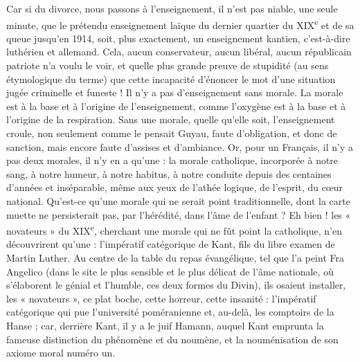 \documentclass[french,twoside]{book} %
\begin{document}
Car si du divorce, nous passons à l’enseignement, il n’est pas niable, une seule minute, que le prétendu enseignement laïque du dernier quartier du XIX\textsuperscript{e} et de sa queue jusqu’en 1914, soit, plus exactement, un enseignement kantien, c’est-à-dire luthérien et allemand. Cela, aucun conservateur, aucun libéral, aucun républicain patriote n’a voulu le voir, et quelle plus grande preuve de stupidité (au sens étymologique du terme) que cette incapacité d’énoncer le mot d’une situation jugée criminelle et funeste ! Il n’y a pas d’enseignement sans morale. La morale est à la base et à l’origine de l’enseignement, comme l’oxygène est à la base et à l’origine de la respiration. Sans une morale, quelle qu’elle soit, l’enseignement croule, non seulement comme le pensait Guyau, faute d’obligation, et donc de sanction, mais encore faute d’assises et d’ambiance. Or, pour un Français, il n’y a pas deux morales, il n’y en a qu’une : la morale catholique, incorporée à notre sang, à notre humeur, à notre habitus, à notre conduite depuis des centaines d’années et inséparable, même aux yeux de l’athée logique, de l’esprit, du cœur national. Qu’est-ce qu’une morale qui ne serait point traditionnelle, dont la carte muette ne persisterait pas, par l’hérédité, dans l’âme de l’enfant ? Eh bien ! les « novateurs » du XIX\textsuperscript{e}, cherchant une morale qui ne fût point la catholique, n’en découvrirent qu’une : l’impératif catégorique de Kant, fils du libre examen de Martin Luther. Au centre de la table du repas évangélique, tel que l’a peint Fra Angelico (dans le site le plus sensible et le plus délicat de l’âme nationale, où s’élaborent le génial et l’humble, ces deux formes du Divin), ils osaient installer, les « novateurs », ce plat boche, cette horreur, cette insanité : l’impératif catégorique qui pue l’université poméranienne et, au-delà, les comptoirs de la Hanse ; car, derrière Kant, il y a le juif Hamann, auquel Kant emprunta la fameuse distinction du phénomène et du noumène, et la nouménisation de son axiome moral numéro un.\par
\end{document}
